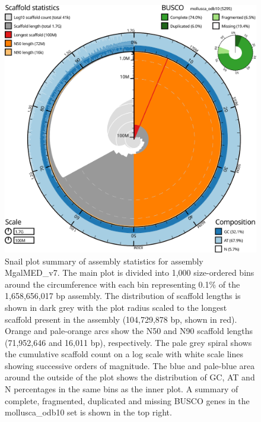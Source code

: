 \documentclass[11pt, a4paper]{article}
\begin{document}
\begin{figure}
	\includegraphics[width=\linewidth]{figures/btk_snail_MgalMED_v7}
	\caption{Snail plot summary of assembly statistics for assembly MgalMED\_v7. The main plot is divided into 1,000 size-ordered bins around the circumference with each bin representing 0.1\% of the 1,658,656,017 bp assembly. The distribution of scaffold lengths is shown in dark grey with the plot radius scaled to the longest scaffold present in the assembly (104,729,878 bp, shown in red). Orange and pale-orange arcs show the N50 and N90 scaffold lengths (71,952,646 and 16,011 bp), respectively. The pale grey spiral shows the cumulative scaffold count on a log scale with white scale lines showing successive orders of magnitude. The blue and pale-blue area around the outside of the plot shows the distribution of GC, AT and N percentages in the same bins as the inner plot. A summary of complete, fragmented, duplicated and missing BUSCO genes in the mollusca\_odb10 set is shown in the top right.}
	\label{supfig:btk-snail-MgalMED}
\end{figure}
\end{document}
